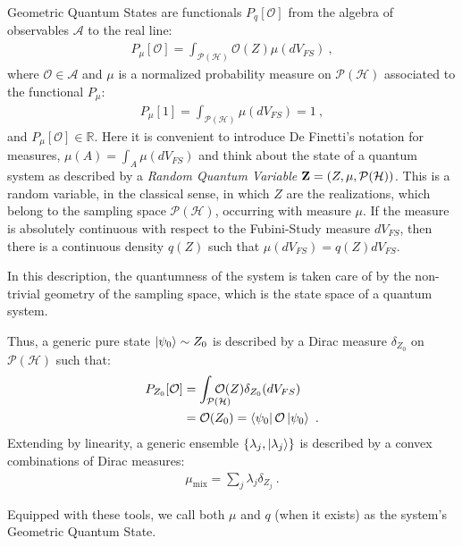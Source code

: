\documentclass[draft,nofootinbib,pre,twocolumn,showpacs,showkeys,preprintnumbers,floatfix]{revtex4-1}
\newcommand{\1}{\mathbbm{1}}
\newcommand{\intP}{\int_{\mathcal{P}(\mathcal{H})} \!\!\!\!\!\!\!\!\!}
\newcommand{\PH}{\mathcal{P}(\mathcal{H})}
\begin{document}
Geometric Quantum States are functionals $P_q[\mathcal{O}]$ from the algebra of
observables $\mathcal{A}$ to the real line: 
\begin{align}
P_\mu[\mathcal{O}]
  = \int_{\mathcal{P}(\mathcal{H})}  \mathcal{O}(Z) \mu(dV_{FS})
  ~,
\label{eq:gqs}
\end{align}
where $\mathcal{O} \in \mathcal{A}$ and $\mu $ is a normalized probability
measure on $\PH$ associated to the functional $P_\mu$:
\begin{align*}
P_\mu[1] = \int_{\mathcal{P}(\mathcal{H})}
 \mu(dV_{FS})  = 1
  ~,
\end{align*}
and $P_\mu[\mathcal{O}] \in \mathbb{R}$. Here it is convenient to introduce
De Finetti's notation for measures, $\mu(A) = \int_{A} \mu(dV_{FS})$ and 
think about the state of a quantum system as described by a \emph{Random Quantum Variable} ${\bf Z} = 
(Z,\mu,\PH)$. This is a random variable, in the classical sense, in which $Z$
are the realizations, which belong to the sampling space $\PH$, occurring 
with measure $\mu$. If the measure is absolutely continuous with respect to the
Fubini-Study measure $dV_{FS}$, then there is a continuous density $q(Z)$
such that $\mu(dV_{FS}) = q(Z)dV_{FS}$. 

In this description, the quantumness of the system is taken care of by the non-trivial 
geometry of the sampling space, which is the state 
space of a quantum system.


Thus, a generic pure state $\ket{\psi_0} \sim Z_0$ is described by a Dirac measure 
 $\delta_{Z_0}$ on $\PH$ such that:
\begin{align*}
P_{Z_0}[\mathcal{O}] &= \intP \mathcal{O}(Z) \delta_{Z_0}(dV_{FS}) \\
  & = \mathcal{O}(Z_0)  = \bra{\psi_0}\mathcal{O}\ket{\psi_0}
  ~.
\end{align*}
Extending by linearity, a generic ensemble $\left\{ \lambda_j, \ket{\lambda_j}\right\}$
is described by a convex combinations of Dirac measures:
\begin{align*}
\mu_{\mathrm{mix}} = \sum_{j}\lambda_j \delta_{Z_j}
  ~. 
\end{align*}
 
Equipped with these tools, we call both $\mu$ and $q$ (when it exists) as the system's
Geometric Quantum State.  

\end{document}
